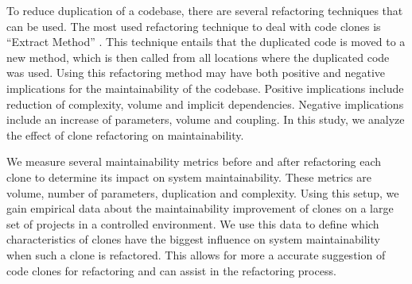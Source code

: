 \documentclass[sigconf,review,anonymous]{acmart}
\begin{document}
To reduce duplication of a codebase, there are several refactoring techniques that can be used. %
The most used refactoring technique to deal with code clones is ``Extract Method'' \cite{fowler2018refactoring}. This technique entails that the duplicated code is moved to a new method, which is then called from all locations where the duplicated code was used. Using this refactoring method may have both positive and negative implications for the maintainability of the codebase. Positive implications include reduction of complexity, volume and implicit dependencies. Negative implications include an increase of parameters, volume and coupling. %
In this study, we analyze the effect of clone refactoring on maintainability.  %

We measure several maintainability metrics \cite{heitlager2007practical} before and after refactoring each clone to determine its impact on system maintainability. These metrics are volume, number of parameters, duplication and complexity. Using this setup, we gain empirical data about the maintainability improvement of clones on a large set of projects in a controlled environment. We use this data to define which characteristics of clones have the biggest influence on system maintainability when such a clone is refactored. This allows for more a accurate suggestion of code clones for refactoring and can assist in the refactoring process.
\end{document}
